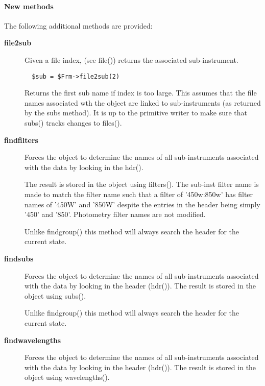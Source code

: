 \paragraph*{New methods\label{ORAC::Frame::JCMT_New_methods}}

The following additional methods are provided:

\begin{description}
\item[\textbf{file2sub}] \mbox{}

Given a file index, (see file()) returns the associated
sub-instrument.

\begin{verbatim}
  $sub = $Frm->file2sub(2)
\end{verbatim}


Returns the first sub name if index is too large.
This assumes that the file names associated wth the
object are linked to sub-instruments (as returned
by the subs method). It is up to the primitive writer
to make sure that subs() tracks changes to files().

\item[\textbf{findfilters}] \mbox{}

Forces the object to determine the names of all sub-instruments
associated with the data by looking in the hdr().



The result is stored in the object using filters(). The sub-inst filter
name is made to match the filter name such that a filter of '450w:850w'
has filter names of '450W' and '850W' despite the entries in the header
being simply '450' and '850'. Photometry filter names are not modified.



Unlike findgroup() this method will always search the header for
the current state.

\item[\textbf{findsubs}] \mbox{}

Forces the object to determine the names of all sub-instruments
associated with the data by looking in the header (hdr()). 
The result is stored in the object using subs().



Unlike findgroup() this method will always search the header for
the current state.

\item[\textbf{findwavelengths}] \mbox{}

Forces the object to determine the names of all sub-instruments
associated with the data by looking in the header (hdr()). 
The result is stored in the object using wavelengths().




\end{description}
